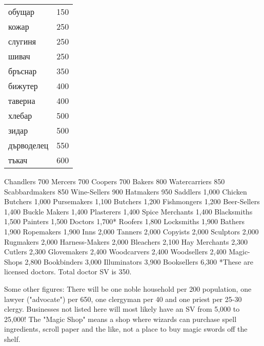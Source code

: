 \begin{tabular}{p{3cm} | p{2cm}}
обущар      & 150   \\
кожар       & 250   \\
слугиня     & 250   \\
шивач       & 250   \\
бръснар     & 350   \\
бижутер     & 400   \\
таверна     & 400   \\
хлебар      & 500   \\
зидар       & 500   \\
дърводелец  & 550   \\
тъкач       & 600   \\

\end{tabular}

Chandlers     700
Mercers     700
Coopers     700
Bakers                   800
Watercarriers     850
Scabbardmakers   850
Wine-Sellers     900
Hatmakers     950
Saddlers     1,000
Chicken Butchers  1,000
Pursemakers     1,100
Butchers     1,200
Fishmongers     1,200
Beer-Sellers     1,400
Buckle Makers     1,400
Plasterers     1,400
Spice Merchants   1,400
Blacksmiths     1,500
Painters     1,500
Doctors                   1,700*
Roofers       1,800
Locksmiths     1,900
Bathers                   1,900
Ropemakers     1,900
Inns                   2,000
Tanners                   2,000
Copyists    2,000
Sculptors    2,000
Rugmakers    2,000
Harness-Makers  2,000
Bleachers    2,100
Hay Merchants    2,300
Cutlers                  2,300
Glovemakers   2,400
Woodcarvers   2,400
Woodsellers   2,400
Magic-Shops   2,800
Bookbinders   3,000
Illuminators   3,900
Booksellers   6,300
*These are licensed doctors. Total doctor SV is 350.

Some other figures: There will be one noble household per 200 population, one lawyer ("advocate") per 650, one clergyman per 40 and one priest per 25-30 clergy. Businesses not listed here will most likely have an SV from 5,000 to 25,000! The "Magic Shop" means a shop where wizards can purchase spell ingredients, scroll paper and the like, not a place to buy magic swords off the shelf. 


